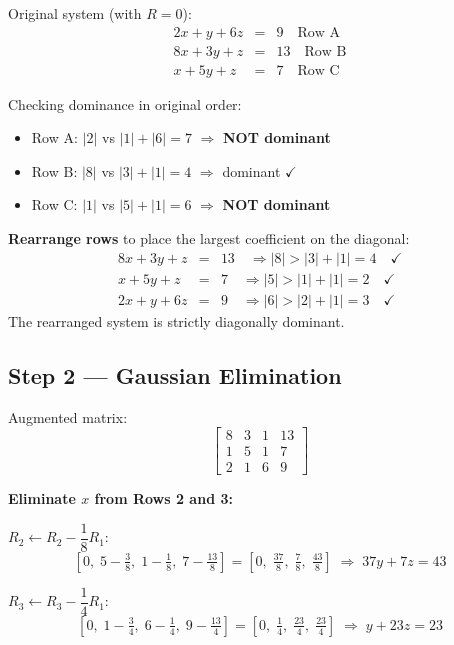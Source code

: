 \documentclass[12pt]{article}
\begin{document}
Original system (with $R=0$):
\[
\begin{array}{rcl}
  2x + y + 6z &=& 9  \quad \text{Row A}\\
  8x + 3y + z &=& 13 \quad \text{Row B}\\
  x + 5y + z  &=& 7  \quad \text{Row C}
\end{array}
\]

Checking dominance in original order:
\begin{itemize}[noitemsep]
  \item Row A: $|2|$ vs $|1|+|6|=7$ \quad $\Rightarrow$ \textbf{NOT dominant}
  \item Row B: $|8|$ vs $|3|+|1|=4$ \quad $\Rightarrow$ dominant $\checkmark$
  \item Row C: $|1|$ vs $|5|+|1|=6$ \quad $\Rightarrow$ \textbf{NOT dominant}
\end{itemize}

\medskip
\textbf{Rearrange rows} to place the largest coefficient on the diagonal:
\[
\begin{array}{rcl}
  8x + 3y + z  &=& 13 \quad \Rightarrow |8|>|3|+|1|=4 \quad\checkmark\\
  x + 5y + z   &=& 7  \quad \Rightarrow |5|>|1|+|1|=2 \quad\checkmark\\
  2x + y + 6z  &=& 9  \quad \Rightarrow |6|>|2|+|1|=3 \quad\checkmark
\end{array}
\]
The rearranged system is strictly diagonally dominant.

\subsection*{Step 2 --- Gaussian Elimination}

Augmented matrix:
\[
\left[\begin{array}{rrr|r}
  8 & 3 & 1 & 13 \\
  1 & 5 & 1 & 7  \\
  2 & 1 & 6 & 9
\end{array}\right]
\]

\medskip
\noindent\textbf{Eliminate $x$ from Rows 2 and 3:}

$R_2 \leftarrow R_2 - \dfrac{1}{8}R_1$:
\[
  \left[0,\; 5-\tfrac{3}{8},\; 1-\tfrac{1}{8},\; 7-\tfrac{13}{8}\right]
  = \left[0,\; \tfrac{37}{8},\; \tfrac{7}{8},\; \tfrac{43}{8}\right]
  \;\Rightarrow\; 37y + 7z = 43
\]

$R_3 \leftarrow R_3 - \dfrac{1}{4}R_1$:
\[
  \left[0,\; 1-\tfrac{3}{4},\; 6-\tfrac{1}{4},\; 9-\tfrac{13}{4}\right]
  = \left[0,\; \tfrac{1}{4},\; \tfrac{23}{4},\; \tfrac{23}{4}\right]
  \;\Rightarrow\; y + 23z = 23
\]
\end{document}
